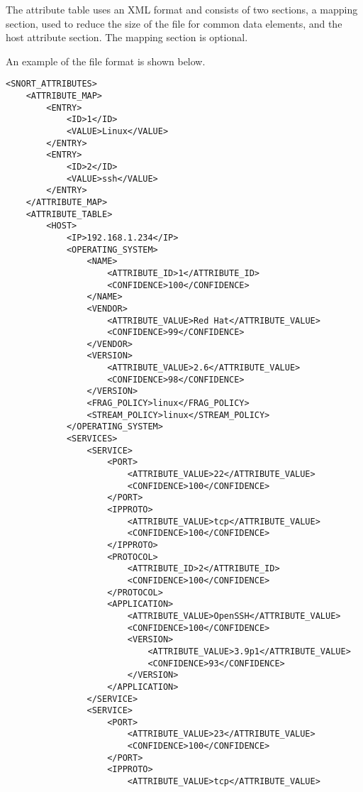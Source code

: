 \documentclass[english]{report}
\begin{document}
The attribute table uses an XML format and consists of two sections, a mapping
section, used to reduce the size of the file for common data elements, and the
host attribute section.  The mapping section is optional.

An example of the file format is shown below.

\begin{verbatim}
<SNORT_ATTRIBUTES>
    <ATTRIBUTE_MAP>
        <ENTRY>
            <ID>1</ID>
            <VALUE>Linux</VALUE>
        </ENTRY>
        <ENTRY>
            <ID>2</ID>
            <VALUE>ssh</VALUE>
        </ENTRY>
    </ATTRIBUTE_MAP>
    <ATTRIBUTE_TABLE>
        <HOST>
            <IP>192.168.1.234</IP>
            <OPERATING_SYSTEM>
                <NAME>
                    <ATTRIBUTE_ID>1</ATTRIBUTE_ID>
                    <CONFIDENCE>100</CONFIDENCE>
                </NAME>
                <VENDOR>
                    <ATTRIBUTE_VALUE>Red Hat</ATTRIBUTE_VALUE>
                    <CONFIDENCE>99</CONFIDENCE>
                </VENDOR>
                <VERSION>
                    <ATTRIBUTE_VALUE>2.6</ATTRIBUTE_VALUE>
                    <CONFIDENCE>98</CONFIDENCE>
                </VERSION>
                <FRAG_POLICY>linux</FRAG_POLICY>
                <STREAM_POLICY>linux</STREAM_POLICY>
            </OPERATING_SYSTEM>
            <SERVICES>
                <SERVICE>
                    <PORT>
                        <ATTRIBUTE_VALUE>22</ATTRIBUTE_VALUE>
                        <CONFIDENCE>100</CONFIDENCE>
                    </PORT>
                    <IPPROTO>
                        <ATTRIBUTE_VALUE>tcp</ATTRIBUTE_VALUE>
                        <CONFIDENCE>100</CONFIDENCE>
                    </IPPROTO>
                    <PROTOCOL>
                        <ATTRIBUTE_ID>2</ATTRIBUTE_ID>
                        <CONFIDENCE>100</CONFIDENCE>
                    </PROTOCOL>
                    <APPLICATION>
                        <ATTRIBUTE_VALUE>OpenSSH</ATTRIBUTE_VALUE>
                        <CONFIDENCE>100</CONFIDENCE>
                        <VERSION>
                            <ATTRIBUTE_VALUE>3.9p1</ATTRIBUTE_VALUE>
                            <CONFIDENCE>93</CONFIDENCE>
                        </VERSION>
                    </APPLICATION>
                </SERVICE>
                <SERVICE>
                    <PORT>
                        <ATTRIBUTE_VALUE>23</ATTRIBUTE_VALUE>
                        <CONFIDENCE>100</CONFIDENCE>
                    </PORT>
                    <IPPROTO>
                        <ATTRIBUTE_VALUE>tcp</ATTRIBUTE_VALUE>

\end{verbatim}
\end{document}
